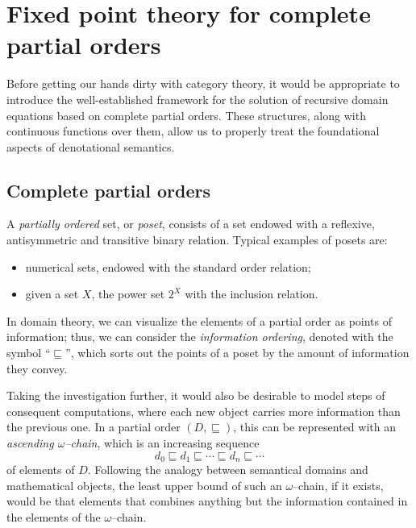 \section[Fixed point theory for cpos]%
{Fixed point theory for complete partial orders}

Before getting our hands dirty with category theory, it would be appropriate to
introduce the well-established framework for the solution of recursive domain
equations based on complete partial orders.
These structures, along with continuous functions over them, allow us to properly treat the foundational aspects of denotational semantics.

\subsection[Complete partial orders]{Complete partial orders}

A \emph{partially ordered} set, or \emph{poset}, consists of a set endowed with a reflexive, antisymmetric and transitive binary relation.
Typical examples of posets are:
\begin{itemize}
  \item numerical sets, endowed with the standard order relation;
  \item given a set \(X\), the power set \(2^X\) with the inclusion relation.
\end{itemize}
In domain theory, we can visualize the elements of a partial order as points of information; thus, we can consider the \emph{information ordering}, denoted with the symbol ``\(\sqsubseteq\)'', which sorts out the points of a poset by the amount of information they convey.

Taking the investigation further, it would also be desirable to model steps of consequent computations, where each new object carries more information than the previous one.
In a partial order \((D, {}\sqsubseteq)\), this can be represented with an
\emph{ascending \(\omega\)--chain}, which is an increasing sequence
\begin{equation*}
  d_0 \sqsubseteq d_1 \sqsubseteq \dotsb \sqsubseteq d_n \sqsubseteq \dotsb{}
\end{equation*}
of elements of \(D\).
Following the analogy between semantical domains and mathematical objects, the least upper bound of such an \(\omega\)--chain, if it exists, would be that elements that combines anything but the information contained in the elements of the \(\omega\)--chain.

